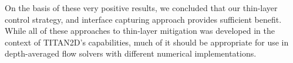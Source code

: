 \documentclass[letterpaper,10pt]{article}
\begin{document}
%
On the basis of these very positive results, we concluded that our 
thin-layer control strategy, and interface capturing approach provides sufficient benefit. 
While all of these approaches to thin-layer mitigation was developed in the 
context of TITAN2D's capabilities, much of it should be appropriate 
for use in depth-averaged flow solvers with different numerical 
implementations.
\newpage
\appendix
 


\end{document}
